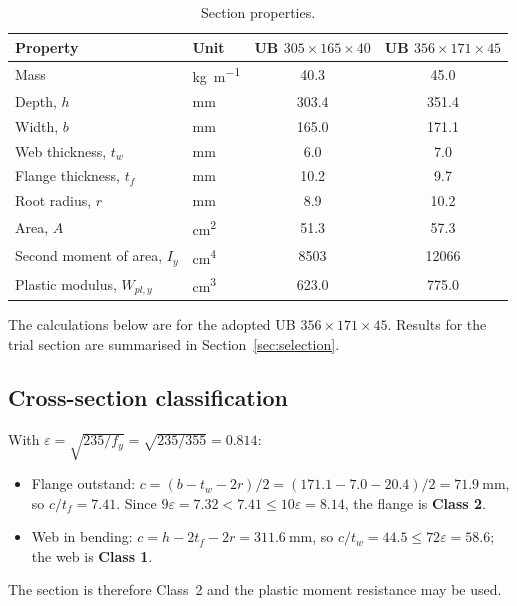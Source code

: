 \documentclass[11pt,a4paper]{article}
\begin{document}
\begin{table}[H]
  \centering
  \caption{Section properties.}
  \label{tab:sections}
  \begin{tabular}{@{}llS[table-format=3.1]S[table-format=3.1]@{}}
    \toprule
    Property & Unit & {UB $305\times165\times40$} & {UB $356\times171\times45$} \\
    \midrule
    Mass & \unit{\kilo\gram\per\metre} & 40.3 & 45.0 \\
    Depth, $h$ & \unit{\milli\metre} & 303.4 & 351.4 \\
    Width, $b$ & \unit{\milli\metre} & 165.0 & 171.1 \\
    Web thickness, $t_w$ & \unit{\milli\metre} & 6.0 & 7.0 \\
    Flange thickness, $t_f$ & \unit{\milli\metre} & 10.2 & 9.7 \\
    Root radius, $r$ & \unit{\milli\metre} & 8.9 & 10.2 \\
    Area, $A$ & \unit{\centi\metre\squared} & 51.3 & 57.3 \\
    Second moment of area, $I_y$ & \unit{\centi\metre\tothe{4}} & {\num{8503}} & {\num{12066}} \\
    Plastic modulus, $W_{pl,y}$ & \unit{\centi\metre\cubed} & 623.0 & 775.0 \\
    \bottomrule
  \end{tabular}
\end{table}

The calculations below are for the adopted UB $356\times171\times45$. Results for the trial section are summarised in Section~\ref{sec:selection}.

\subsection{Cross-section classification}

With $\varepsilon = \sqrt{235/f_y} = \sqrt{235/355} = 0.814$:

\begin{itemize}[nosep]
  \item Flange outstand: $c = (b - t_w - 2r)/2 = (171.1 - 7.0 - 20.4)/2 = \qty{71.9}{\milli\metre}$, so $c/t_f = 7.41$. Since $9\varepsilon = 7.32 < 7.41 \le 10\varepsilon = 8.14$, the flange is \textbf{Class 2}.
  \item Web in bending: $c = h - 2t_f - 2r = \qty{311.6}{\milli\metre}$, so $c/t_w = 44.5 \le 72\varepsilon = 58.6$; the web is \textbf{Class 1}.
\end{itemize}
The section is therefore Class~2 and the plastic moment resistance may be used.
\end{document}

